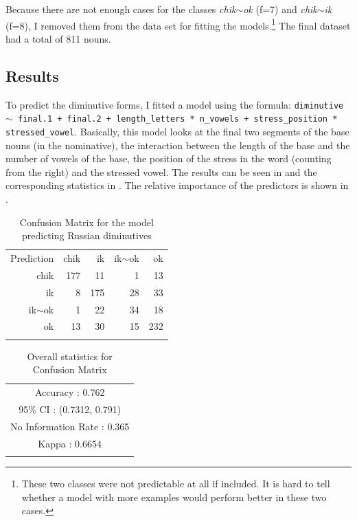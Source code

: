 Because there are not enough cases for the classes \textit{chik$\sim$ok} (f=7) and \textit{chik$\sim$ik} (f=8), I removed them from the data set for fitting the models.\footnote{These two classes were not predictable at all if included. It is hard to tell whether a model with more examples would perform better in these two cases.} The final dataset had a total of 811 nouns.

\subsection{Results}

\largerpage
To predict the diminutive forms, I fitted a model using the formula: \texttt{diminutive $\sim$
  final.1 + final.2 + length\_letters * n\_vowels + stress\_position * stressed\_vowel}. Basically, this model looks at the final two segments of the base nouns (in the nominative), the interaction between the length of the base and the number of vowels of the base, the position of the stress in the word (counting from the right) and the stressed vowel. The results can be seen in  and the corresponding statistics in . The relative importance of the predictors is shown in .

\begin{table}
  \centering
  \begin{tabular}{rrrrr}
    \lsptoprule
    \multicolumn{5}{c}{Reference}               \\
    \midrule
    Prediction  & chik & ik  & ik$\sim$ok & ok  \\
     chik       & 177  & 11  & 1          & 13  \\
     ik         & 8    & 175 & 28         & 33  \\
     ik$\sim$ok & 1    & 22  & 34         & 18  \\
     ok         & 13   & 30  & 15         & 232 \\
    \lspbottomrule
  \end{tabular}
  \caption{Confusion Matrix for the model predicting Russian diminutives}\label{tab:dim-russ}
\end{table}

\begin{table}
  \centering
  \begin{tabular}{llrrr}
    \lsptoprule
    \multicolumn{5}{c}{Overall statistics:} \\

    \midrule
    \multicolumn{5}{c}{Accuracy : 0.762}\\
    \multicolumn{5}{c}{95\% CI : (0.7312, 0.791)}\\
    \multicolumn{5}{c}{No Information Rate : 0.365}\\
    \multicolumn{5}{c}{Kappa : 0.6654}\\
    \lspbottomrule
  \end{tabular}
  \caption{Overall statistics for Confusion Matrix }\label{tab:dim-russ-stats}
\end{table}

